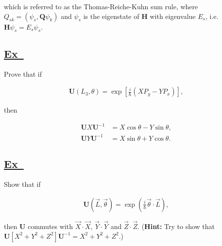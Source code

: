 \documentclass[a4paper,12pt]{article}
\newcommand{\excercise}{\addtocounter{section}{+1}
\subsection*{\underline{Ex~\thesection}}}
\begin{document}
\noindent which is referred to as the Thomas-Reiche-Kuhn sum rule,
 where $ Q_{sk}=(\psi_s,\mathbf{Q}\psi_k) $  and  $ \psi_s $ is the eigenstate of $ \mathbf{H} $ with eigenvalue $ E_s $, i.e. $ \mathbf{H}\psi_s=E_s\psi_s $.



\excercise

Prove that if 

 
\begin{align*}
\mathbf{U}(L_3,\theta)=\exp\left[\frac{i}{\hbar}(XP_y-YP_x)\right],
\end{align*}

then

\begin{align*}
\mathbf{U}X\mathbf{U}^{-1}&=X\cos\theta-Y\sin\theta,\\
\mathbf{U}Y\mathbf{U}^{-1}&=X\sin\theta+Y\cos\theta.
\end{align*}

\excercise

Show that if 

\begin{align*}
\mathbf{U}(\vec{L},\vec{\theta})=\exp\left(\frac{i}{\hbar}\vec{\theta}\cdot\vec{L}\right),
\end{align*}

then $\mathbf{U}$ commutes with $\vec{X}\cdot\vec{X}$, $\vec{Y}\cdot\vec{Y}$ and $\vec{Z}\cdot\vec{Z}$. (\textbf{Hint:} Try to show that $\mathbf{U}[X^2+Y^2+Z^2]\mathbf{U}^{-1}=X^2+Y^2+Z^2.$)
\end{document}
